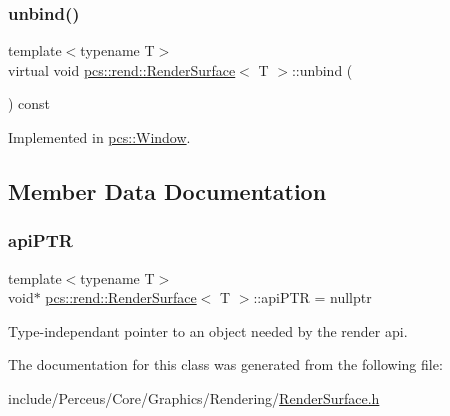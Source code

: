 \subsubsection{\texorpdfstring{unbind()}{unbind()}}
{\footnotesize\ttfamily template$<$typename T$>$ \\
virtual void \hyperlink{classpcs_1_1rend_1_1RenderSurface}{pcs\+::rend\+::\+Render\+Surface}$<$ T $>$\+::unbind (\begin{DoxyParamCaption}{ }\end{DoxyParamCaption}) const\hspace{0.3cm}{\ttfamily [pure virtual]}}



Implemented in \hyperlink{classpcs_1_1Window_a4d103be3712fbb051d7c4d446a266de0}{pcs\+::\+Window}.



\subsection{Member Data Documentation}
\mbox{\label{classpcs_1_1rend_1_1RenderSurface_ac991c5aaed973108fa4bb97d605f02cc}} 
\subsubsection{\texorpdfstring{api\+P\+TR}{apiPTR}}
{\footnotesize\ttfamily template$<$typename T$>$ \\
void$\ast$ \hyperlink{classpcs_1_1rend_1_1RenderSurface}{pcs\+::rend\+::\+Render\+Surface}$<$ T $>$\+::api\+P\+TR = nullptr\hspace{0.3cm}{\ttfamily [protected]}}



Type-\/independant pointer to an object needed by the render api. 



The documentation for this class was generated from the following file\+:\begin{DoxyCompactItemize}
\item 
include/\+Perceus/\+Core/\+Graphics/\+Rendering/\hyperlink{RenderSurface_8h}{Render\+Surface.\+h}\end{DoxyCompactItemize}
